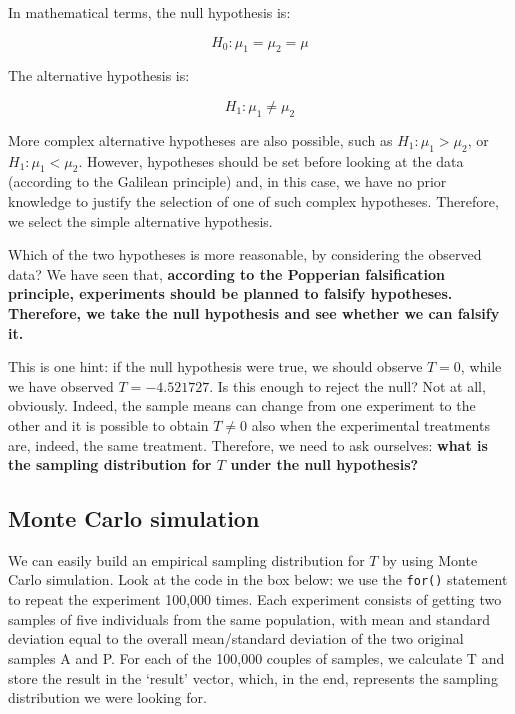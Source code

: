 \documentclass[a4paper,12pt,oneside]{book}
\begin{document}
In mathematical terms, the null hypothesis is:

\[H_0: \mu_1 = \mu_2 = \mu\]

The alternative hypothesis is:

\[H_1 :\mu_1  \neq \mu_2\]

More complex alternative hypotheses are also possible, such as \(H_1 :\mu _1 > \mu _2\), or \(H_1 :\mu _1 < \mu _2\). However, hypotheses should be set before looking at the data (according to the Galilean principle) and, in this case, we have no prior knowledge to justify the selection of one of such complex hypotheses. Therefore, we select the simple alternative hypothesis.

Which of the two hypotheses is more reasonable, by considering the observed data? We have seen that, \textbf{according to the Popperian falsification principle, experiments should be planned to falsify hypotheses. Therefore, we take the null hypothesis and see whether we can falsify it.}

This is one hint: if the null hypothesis were true, we should observe \(T = 0\), while we have observed \(T = -4.521727\). Is this enough to reject the null? Not at all, obviously. Indeed, the sample means can change from one experiment to the other and it is possible to obtain \(T \neq 0\) also when the experimental treatments are, indeed, the same treatment. Therefore, we need to ask ourselves: \textbf{what is the sampling distribution for \(T\) under the null hypothesis?}

\hypertarget{monte-carlo-simulation}{%
\subsection{Monte Carlo simulation}\label{monte-carlo-simulation}}

We can easily build an empirical sampling distribution for \(T\) by using Monte Carlo simulation. Look at the code in the box below: we use the \texttt{for()} statement to repeat the experiment 100,000 times. Each experiment consists of getting two samples of five individuals from the same population, with mean and standard deviation equal to the overall mean/standard deviation of the two original samples A and P. For each of the 100,000 couples of samples, we calculate T and store the result in the `result' vector, which, in the end, represents the sampling distribution we were looking for.
\end{document}
